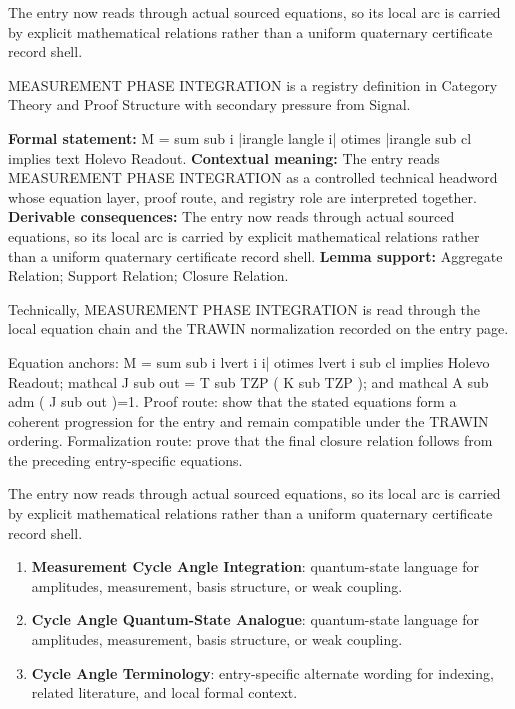 The entry now reads through actual sourced equations, so its local arc is carried by explicit mathematical relations rather than a uniform quaternary certificate record shell.
\clearpage


\begingroup\small
{}
MEASUREMENT PHASE INTEGRATION is a registry definition in Category Theory and Proof Structure with secondary pressure from Signal.

\begingroup\footnotesize\setlength{\emergencystretch}{3em}\sloppy
\textbf{Formal statement:} M = sum sub i |irangle langle i| otimes |irangle sub cl implies text Holevo Readout. \textbf{Contextual meaning:} The entry reads MEASUREMENT PHASE INTEGRATION as a controlled technical headword whose equation layer, proof route, and registry role are interpreted together. \textbf{Derivable consequences:} The entry now reads through actual sourced equations, so its local arc is carried by explicit mathematical relations rather than a uniform quaternary certificate record shell. \textbf{Lemma support:} Aggregate Relation; Support Relation; Closure Relation.\par
\endgroup

Technically, MEASUREMENT PHASE INTEGRATION is read through the local equation chain and the TRAWIN normalization recorded on the entry page.

Equation anchors: M = sum sub i lvert i i| otimes lvert i sub cl implies Holevo Readout; mathcal J sub out = T sub TZP ( K sub TZP ); and mathcal A sub adm ( J sub out )=1. Proof route: show that the stated equations form a coherent progression for the entry and remain compatible under the TRAWIN ordering. Formalization route: prove that the final closure relation follows from the preceding entry-specific equations.

The entry now reads through actual sourced equations, so its local arc is carried by explicit mathematical relations rather than a uniform quaternary certificate record shell.
\endgroup

\begin{enumerate}[leftmargin=1.6em,itemsep=6pt,topsep=4pt]
\item \textbf{Measurement Cycle Angle Integration}: quantum-state language for amplitudes, measurement, basis structure, or weak coupling.
\item \textbf{Cycle Angle Quantum-State Analogue}: quantum-state language for amplitudes, measurement, basis structure, or weak coupling.
\item \textbf{Cycle Angle Terminology}: entry-specific alternate wording for indexing, related literature, and local formal context.
\end{enumerate}

